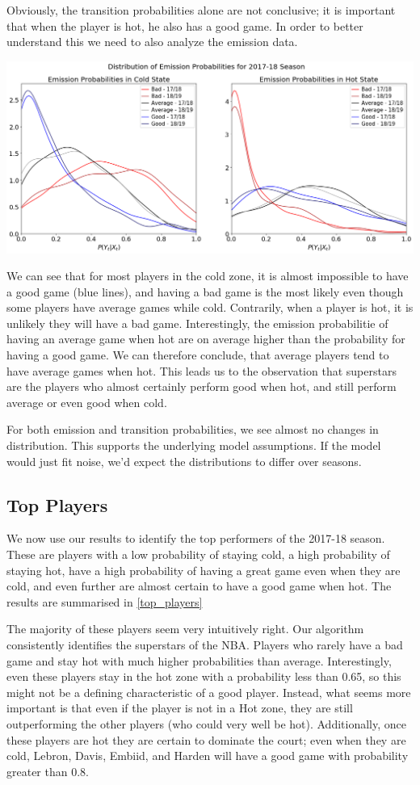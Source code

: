 \documentclass[12pt, authoryear]{elsarticle}
\begin{document}
Obviously, the transition probabilities alone are not conclusive; it is important that when the player is hot, he also has a good game. In order to better understand this we need to also analyze the emission data. 

\includegraphics[scale=0.4]{2dist_of_emission_probs_perseason}

We can see that for most players in the cold zone, it is almost impossible to have a good game (blue lines), and having a bad game is the most likely even though some players have average games while cold. Contrarily, when a player is hot, it is unlikely they will have a bad game. Interestingly, the emission probabilitie of having an average game when hot are on average higher than the probability for having a good game. We can therefore conclude, that average players tend to have average games when hot. This leads us to the observation that superstars are the players who almost certainly perform good when hot, and still perform average or even good when cold.

For both emission and transition probabilities, we see almost no changes in distribution. This supports the underlying model assumptions. If the model would just fit noise, we'd expect the distributions to differ over seasons. 

\subsection{Top Players}

We now use our results to identify the top performers of the 2017-18 season. These are players with a low probability of staying cold, a high probability of staying hot, have a high probability of having a great game even when they are cold, and even further are almost certain to have a good game when hot. The results are summarised in \ref{top_players}

The majority of these players seem very intuitively right. Our algorithm consistently identifies the superstars of the NBA. Players who rarely have a bad game and stay hot with much higher probabilities than average. Interestingly, even these players stay in the hot zone with a probability less than 0.65, so this might not be a defining characteristic of a good player. Instead, what seems more important is that even if the player is not in a Hot zone, they are still outperforming the other players (who could very well be hot). Additionally, once these players are hot they are certain to dominate the court; even when they are cold, Lebron, Davis, Embiid, and Harden will have a good game with probability greater than 0.8.
 
\end{document}

